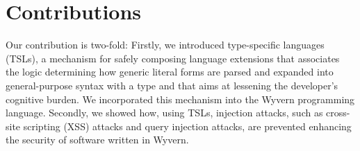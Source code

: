 \documentclass{sig-alternate}
\newcommand{\qs}[1]{}%
\begin{document}
\section{Contributions}
\qs{Clearly show how the results of your work contribute to computer science and explain the significance of those results.}

Our contribution is two-fold: Firstly, we introduced type-specific languages (TSLs), a mechanism for safely composing language extensions that associates the logic determining how generic literal forms are parsed and expanded into general-purpose syntax with a type and that aims at lessening the developer's cognitive burden. We incorporated this mechanism into the Wyvern programming language. Secondly, we showed how, using TSLs, injection attacks, such as cross-site scripting (XSS) attacks and query injection attacks, are prevented enhancing the security of software written in Wyvern.



\small

\end{document}
